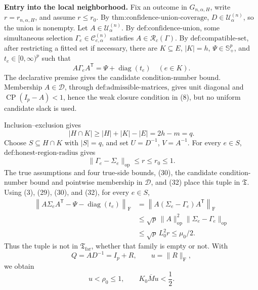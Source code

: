 \textbf{Entry into the local neighborhood.}
Fix an outcome in \(G_{n,\alpha,H}\), write \(r=r_{n,\alpha,H}\), and assume \(r\leq r_0\). By \(\text{thm:confidence-union-coverage}\), \(D\in\mathcal U^{(n)}_\alpha\), so the union is nonempty. Let \(A\in\mathcal U^{(n)}_\alpha\). By \(\text{def:confidence-union}\), some simultaneous selection \(\Gamma_e\in\mathcal C^{(n)}_{e,\alpha}\) satisfies \(A\in\mathcal R_c(\Gamma)\). By \(\text{def:compatible-set}\), after restricting a fitted set if necessary, there are \(K\subseteq E\), \(|K|=h\), \(\Psi\in\mathbb S_+^p\), and \(t_e\in[0,\infty)^p\) such that
\[
A\Gamma_eA^{\mathsf T}=\Psi+\operatorname{diag}(t_e)
\quad(e\in K).
\tag{30}
\]
The declarative premise gives the candidate condition-number bound. Membership \(A\in\mathcal D\), through \(\text{def:admissible-matrices}\), gives unit diagonal and \(\operatorname{CP}(I_p-A)<1\), hence the weak closure condition in (8), but no uniform candidate slack is used.

Inclusion--exclusion gives
\[
|H\cap K|\geq|H|+|K|-|E|=2h-m=q.
\tag{31}
\]
Choose \(S\subseteq H\cap K\) with \(|S|=q\), and set \(U=D^{-1}\), \(V=A^{-1}\). For every \(e\in S\), \(\text{def:honest-region-radius}\) gives
\[
\|\Gamma_e-\Sigma_e\|_{\mathrm{op}}
\leq r\leq r_0\leq1.
\tag{32}
\]
The true assumptions and four true-side bounds, (30), the candidate condition-number bound and pointwise membership in \(\mathcal D\), and (32) place this tuple in \(\mathfrak T\). Using (3), (29), (30), and (32), for every \(e\in S\),
\[
\begin{aligned}
\left\|A\Sigma_eA^{\mathsf T}-\Psi-\operatorname{diag}(t_e)\right\|_{\mathrm F}
&=\left\|A(\Sigma_e-\Gamma_e)A^{\mathsf T}\right\|_{\mathrm F}\\
&\leq\sqrt p\,\|A\|_{\mathrm{op}}^2
\|\Sigma_e-\Gamma_e\|_{\mathrm{op}}\\
&\leq\sqrt p\,L_0^2r
\leq\mu_0/2.
\end{aligned}
\tag{33}
\]
Thus the tuple is not in \(\mathfrak T_{\mathrm{far}}\), whether that family is empty or not. With
\[
Q=AD^{-1}=I_p+R,
\qquad u=\|R\|_{\mathrm F},
\]
we obtain
\[
u<\rho_0\leq1,
\qquad K_0\overline M u<\frac12.
\tag{34}
\]

